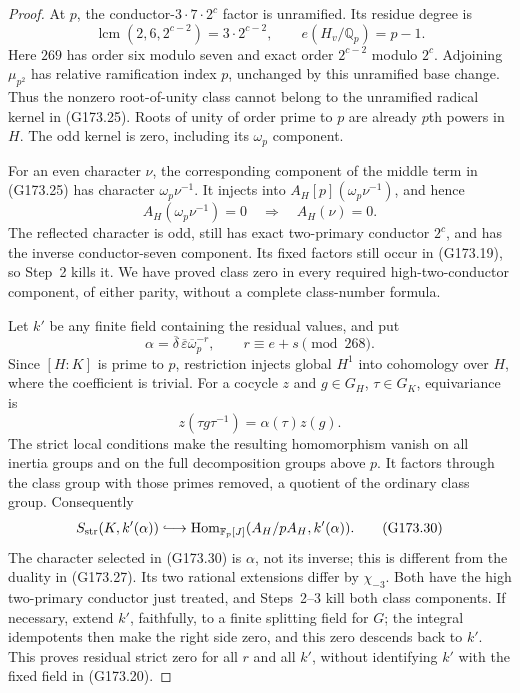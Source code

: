 \begin{proof}
At $p$, the conductor-$3\cdot7\cdot2^c$ factor is unramified.
Its residue degree is
\[
 \operatorname{lcm}(2,6,2^{c-2})=3\cdot2^{c-2},
 \qquad e(H_v/\mathbb Q_p)=p-1.
 \tag{G173.26}
\]
Here $269$ has order six modulo seven and exact order $2^{c-2}$
modulo $2^c$.  Adjoining $\mu_{p^2}$ has relative ramification
index $p$, unchanged by this unramified base change.
Thus the nonzero root-of-unity class cannot belong to the unramified
radical kernel in (G173.25).
Roots of unity of order prime to $p$ are already $p$th powers in $H$.
The odd kernel is zero, including its $\omega_p$ component.

For an even character $\nu$, the corresponding component of the
middle term in (G173.25) has character $\omega_p\nu^{-1}$.
It injects into $A_H[p](\omega_p\nu^{-1})$, and hence
\[
 A_H(\omega_p\nu^{-1})=0\quad\Longrightarrow\quad A_H(\nu)=0.
 \tag{G173.27}
\]
The reflected character is odd, still has exact two-primary
conductor $2^c$, and has the inverse conductor-seven component.
Its fixed factors still occur in (G173.19), so Step~2 kills it.
We have proved class zero in every required high-two-conductor
component, of either parity, without a complete class-number formula.

Let $k'$ be any finite field containing the residual values, and put
\[
             \alpha=\overline\delta\,\overline\varepsilon
                              \overline\omega_p^{-r},
                     \qquad r\equiv e+s\pmod {268}.
 \tag{G173.28}
\]
Since $[H:K]$ is prime to $p$, restriction injects global $H^1$
into cohomology over $H$, where the coefficient is trivial.
For a cocycle $z$ and $g\in G_H$, $\tau\in G_K$, equivariance is
\[
                    z(\tau g\tau^{-1})=\alpha(\tau)z(g).
 \tag{G173.29}
\]
The strict local conditions make the resulting homomorphism vanish
on all inertia groups and on the full decomposition groups above $p$.
It factors through the class group with those primes removed, a
quotient of the ordinary class group.  Consequently
\[
 S_{\rm str}(K,k'(\alpha))\lhook\joinrel\longrightarrow
       \operatorname{Hom}_{\mathbb F_p[J]}
                            (A_H/pA_H,k'(\alpha)).
 \tag{G173.30}
\]
The character selected in (G173.30) is $\alpha$, not its inverse;
this is different from the duality in (G173.27).
Its two rational extensions differ by $\chi_{-3}$.
Both have the high two-primary conductor just treated, and
Steps~2--3 kill both class components.  If necessary, extend $k'$,
faithfully, to a finite splitting field for $G$; the integral
idempotents then make the right side zero, and this zero descends
back to $k'$.  This proves residual strict zero for all
$r$ and all $k'$, without identifying $k'$ with the fixed field in
(G173.20).


\end{proof}
